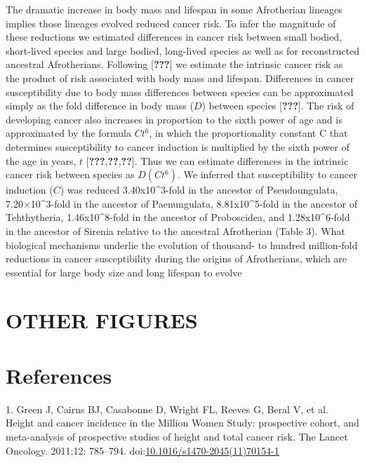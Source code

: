 \documentclass[10pt,letterpaper]{article}
\begin{document}
The dramatic increase in body mass and lifespan in some Afrotherian
lineages implies those lineages evolved reduced cancer risk. To infer
the magnitude of these reductions we estimated differences in cancer
risk between small bodied, short-lived species and large bodied,
long-lived species as well as for reconstructed ancestral Afrotherians.
Following {[}{\textbf{???}}{]} we estimate the intrinsic cancer risk as
the product of risk associated with body mass and lifespan. Differences
in cancer susceptibility due to body mass differences between species
can be approximated simply as the fold difference in body mass (\(D\))
between species {[}{\textbf{???}}{]}. The risk of developing cancer also
increases in proportion to the sixth power of age and is approximated by
the formula \(Ct^6\), in which the proportionality constant C that
determines susceptibility to cancer induction is multiplied by the sixth
power of the age in years, \(t\)
{[}{\textbf{???}},{\textbf{??}},{\textbf{??}}{]}. Thus we can estimate
differences in the intrinsic cancer risk between species as \(D(Ct^6)\).
We inferred that susceptibility to cancer induction (\(C\)) was reduced
3.40x10\^{}3-fold in the ancestor of Pseudoungulata, 7.20×10\^{}3-fold
in the ancestor of Paenungulata, 8.81x10\^{}5-fold in the ancestor of
Tehthytheria, 1.46x10\^{}8-fold in the ancestor of Proboscidea, and
1.28x10\^{}6-fold in the ancestor of Sirenia relative to the ancestral
Afrotherian (Table 3). What biological mechanisms underlie the evolution
of thousand- to hundred million-fold reductions in cancer susceptibility
during the origins of Afrotherians, which are essential for large body
size and long lifespan to evolve

\hypertarget{other-figures}{%
\section{OTHER FIGURES}\label{other-figures}}

\hypertarget{references}{%
\section*{References}\label{references}}

\hypertarget{refs}{}
\leavevmode\hypertarget{ref-Green2011}{}%
1. Green J, Cairns BJ, Casabonne D, Wright FL, Reeves G, Beral V, et al.
Height and cancer incidence in the Million Women Study: prospective
cohort, and meta-analysis of prospective studies of height and total
cancer risk. The Lancet Oncology. 2011;12: 785--794.
doi:\href{https://doi.org/10.1016/s1470-2045(11)70154-1}{10.1016/s1470-2045(11)70154-1}
\end{document}
